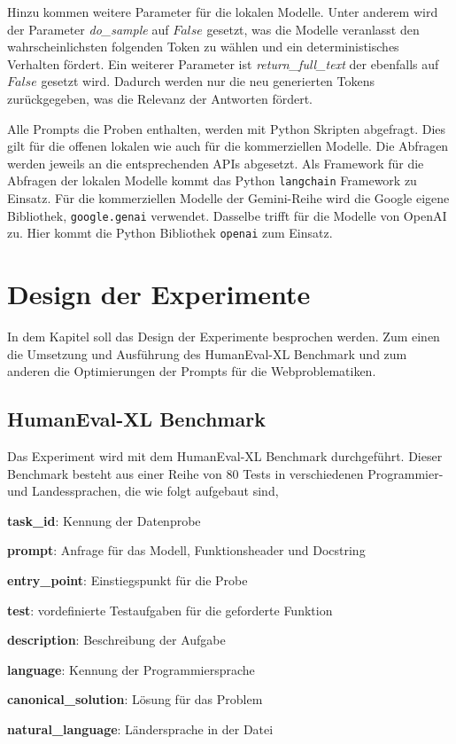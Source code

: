 Hinzu kommen weitere Parameter für die lokalen Modelle. Unter anderem wird der Parameter \textit{do\_sample} auf $False$ gesetzt, was die Modelle veranlasst den wahrscheinlichsten folgenden Token zu wählen und ein deterministisches Verhalten fördert. Ein weiterer Parameter ist \textit{return\_full\_text} der ebenfalls auf $False$ gesetzt wird. Dadurch werden nur die neu generierten Tokens zurückgegeben, was die Relevanz der Antworten fördert.\vspace{0.2cm}

Alle Prompts die Proben enthalten, werden mit Python Skripten abgefragt. Dies gilt für die offenen lokalen wie auch für die kommerziellen Modelle. Die Abfragen werden jeweils an die entsprechenden APIs abgesetzt. Als Framework für die Abfragen der lokalen Modelle kommt das Python \texttt{langchain} Framework zu Einsatz. Für die kommerziellen Modelle der Gemini-Reihe wird die Google eigene Bibliothek, \texttt{google.genai} verwendet. Dasselbe trifft für die Modelle von OpenAI zu. Hier kommt die Python Bibliothek \texttt{openai} zum Einsatz.



\section{Design der Experimente}
In dem Kapitel soll das Design der Experimente besprochen werden. Zum einen die Umsetzung und Ausführung des HumanEval-XL Benchmark und zum anderen die Optimierungen der Prompts für die Webproblematiken.

\subsection{HumanEval-XL Benchmark}
Das Experiment wird mit dem HumanEval-XL Benchmark durchgeführt. Dieser Benchmark besteht aus einer Reihe von 80 Tests in verschiedenen Programmier- und Landessprachen, die wie folgt aufgebaut sind,\vspace{0.2cm}

\begin{myitemize}
	\item \textbf{task\_id}: Kennung der Datenprobe
	\item \textbf{prompt}: Anfrage für das Modell, Funktionsheader und Docstring
	\item \textbf{entry\_point}: Einstiegspunkt für die Probe
	\item \textbf{test}: vordefinierte Testaufgaben für die geforderte Funktion
	\item \textbf{description}: Beschreibung der Aufgabe
	\item \textbf{language}: Kennung der Programmiersprache
	\item \textbf{canonical\_solution}: Lösung für das Problem
	\item \textbf{natural\_language}: Ländersprache in der Datei
\end{myitemize}


